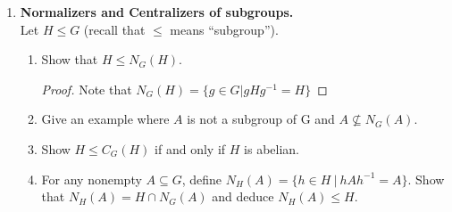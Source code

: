 \documentclass[11pt, reqno]{amsart}
\theoremstyle{plain}
\theoremstyle{definition}
\theoremstyle{example}
\begin{document}
\begin{enumerate}[1.]
\item {\bf Normalizers and Centralizers of subgroups.}\\
Let $H \leq G$ (recall that $\leq$ means ``subgroup''). 
\begin{enumerate}
\item Show that $H \leq N_G(H)$. 
\begin{proof}
Note that $N_G(H) = \{g \in G | gHg^{-1} = H\}$
\end{proof}

\item Give an example where $A$ is not a subgroup of G and $A \not\subseteq N_G(A)$. 
\item Show $H \leq C_G(H)$ if and only if $H$ is abelian.
\item For any nonempty $A \subseteq G$, define $N_H(A) = \{ h \in H ~|~ hAh^{-1} = A \}$. Show that $N_H(A) = H \cap N_G(A)$ and deduce $N_H(A) \leq H$. 
\end{enumerate}

\end{enumerate}
\end{document}
